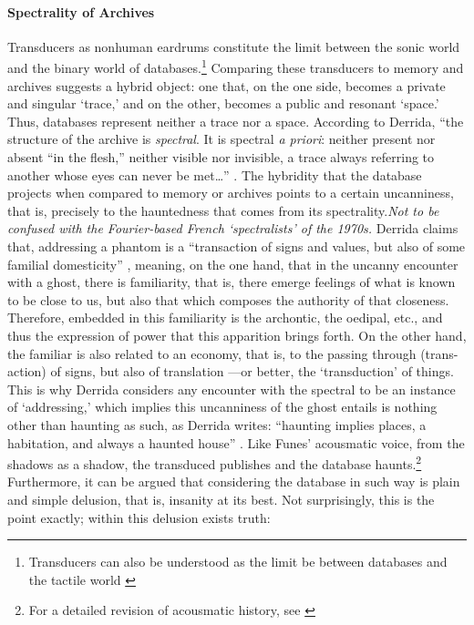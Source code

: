 \paragraph{Spectrality of Archives}
Transducers as nonhuman eardrums constitute the limit between the sonic world and the binary world of databases.\footnote{Transducers can also be understood as the limit be between databases and the tactile world \parencite[223]{Eck13:Bet}} Comparing these transducers to memory and archives suggests a hybrid object: one that, on the one side, becomes a private and singular `trace,' and on the other, becomes a public and resonant `space.' Thus, databases represent neither a trace nor a space. According to Derrida, ``the structure of the archive is \textit{spectral}. It is spectral \textit{a priori}: neither present nor absent ``in the flesh,'' neither visible nor invisible, a trace always referring to another whose eyes can never be met\dots'' \parencite[54]{Der95:Arc}. The hybridity that the database projects when compared to memory or archives points to a certain uncanniness, that is, precisely to the hauntedness that comes from its spectrality.\textit{Not to be confused with the Fourier-based French `spectralists' of the 1970s.} Derrida claims that, addressing a phantom is a ``transaction of signs and values, but also of some familial domesticity'' \parencite[55]{Der95:Arc}, meaning, on the one hand, that in the uncanny encounter with a ghost, there is familiarity, that is, there emerge feelings of what is known to be close to us, but also that which composes the authority of that closeness. Therefore, embedded in this familiarity is the archontic, the oedipal, etc., and thus the expression of power that this apparition brings forth. On the other hand, the familiar is also related to an economy, that is, to the passing through (trans-action) of signs, but also of translation ---or better, the `transduction' of things. This is why Derrida considers any encounter with the spectral to be an instance of `addressing,' which implies this uncanniness of the ghost entails is nothing other than haunting as such, as Derrida writes: ``haunting implies places, a habitation, and always a haunted house'' \parencite[55]{Der95:Arc}. Like Funes' acousmatic voice, from the shadows as a shadow, the transduced publishes and the database haunts.\footnote{For a detailed revision of acousmatic history, see \textcite{Kan14:Sou}} Furthermore, it can be argued that considering the database in such way is plain and simple delusion, that is, insanity at its best. Not surprisingly, this is the point exactly; within this delusion exists truth:


